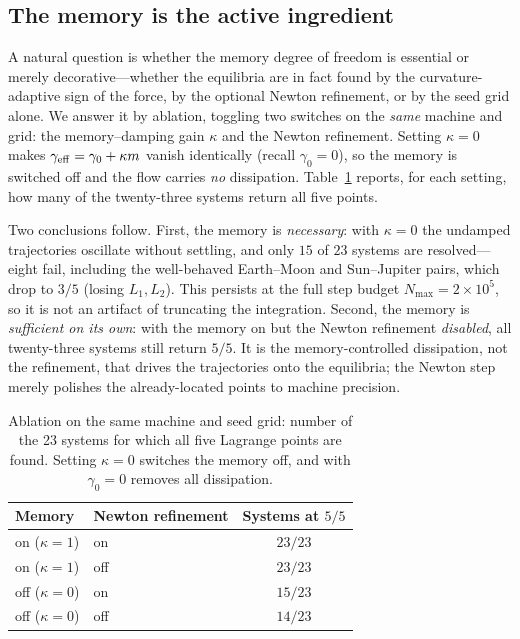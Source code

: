 \documentclass[aip,preprint,amsmath,amssymb,floatfix]{revtex4-2}
\begin{document}
\subsection{The memory is the active ingredient}\label{sec:ablation}

A natural question is whether the memory degree of freedom is essential or merely
decorative---whether the equilibria are in fact found by the curvature-adaptive
sign of the force, by the optional Newton refinement, or by the seed grid alone.
We answer it by ablation, toggling two switches on the \emph{same} machine and
grid: the memory--damping gain $\kappa$ and the Newton refinement. Setting
$\kappa=0$ makes $\gamma_{\rm eff}=\gamma_0+\kappa m$ vanish identically (recall
$\gamma_0=0$), so the memory is switched off and the flow carries \emph{no}
dissipation. Table~\ref{tab:ablation} reports, for each setting, how many of the
twenty-three systems return all five points.

Two conclusions follow. First, the memory is \emph{necessary}: with $\kappa=0$ the
undamped trajectories oscillate without settling, and only $15$ of $23$ systems
are resolved---eight fail, including the well-behaved Earth--Moon and Sun--Jupiter
pairs, which drop to $3/5$ (losing $L_1,L_2$). This persists at the full step
budget $N_{\max}=2\times10^5$, so it is not an artifact of truncating the
integration. Second, the memory is \emph{sufficient on its own}: with the memory
on but the Newton refinement \emph{disabled}, all twenty-three systems still
return $5/5$. It is the memory-controlled dissipation, not the refinement, that
drives the trajectories onto the equilibria; the Newton step merely polishes the
already-located points to machine precision.

\begin{table}[ht]
\centering
\caption{Ablation on the same machine and seed grid: number of the 23 systems for
which all five Lagrange points are found. Setting $\kappa=0$ switches the memory
off, and with $\gamma_0=0$ removes all dissipation.}
\label{tab:ablation}
\begin{tabular}{llc}
\toprule
Memory & Newton refinement & Systems at $5/5$\\
\midrule
on ($\kappa=1$)  & on  & $23/23$\\
on ($\kappa=1$)  & off & $23/23$\\
off ($\kappa=0$) & on  & $15/23$\\
off ($\kappa=0$) & off & $14/23$\\
\bottomrule
\end{tabular}
\end{table}
\end{document}
